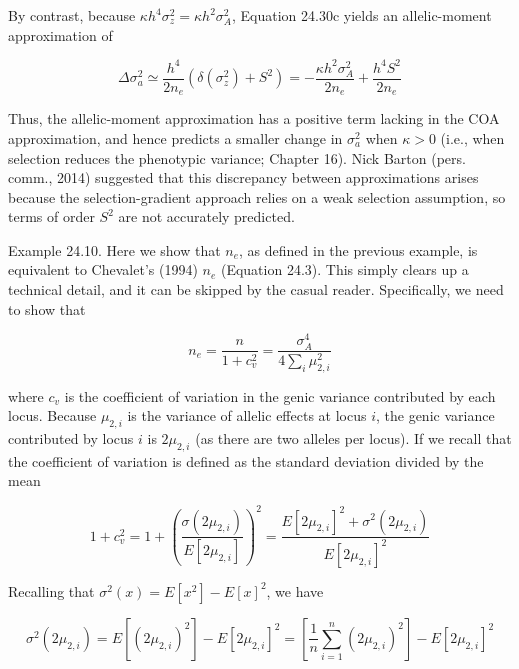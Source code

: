 \documentclass{article}
\begin{document}
By contrast, because  $ \kappa h^4\sigma_z^2 = \kappa h^2\sigma_A^2 $, Equation 24.30c yields an allelic-moment approximation of

\begin{equation}
\Delta\sigma_{a}^{2}\simeq\frac{h^{4}}{2n_{e}}\left(\delta(\sigma_{z}^{2})+S^{2}\right)=-\frac{\kappa h^{2}\sigma_{A}^{2}}{2n_{e}}+\frac{h^{4}S^{2}}{2n_{e}}
\tag{24.30e}
\label{eq:24_30e}
\end{equation}

Thus, the allelic-moment approximation has a positive term lacking in the COA approximation, and hence predicts a smaller change in  $ \sigma_a^2 $ when  $ \kappa > 0 $ (i.e., when selection reduces the phenotypic variance; Chapter 16). Nick Barton (pers. comm., 2014) suggested that this discrepancy between approximations arises because the selection-gradient approach relies on a weak selection assumption, so terms of order  $ S^2 $ are not accurately predicted.

Example 24.10. Here we show that  $ n_{e} $, as defined in the previous example, is equivalent to Chevalet's (1994)  $ n_{e} $ (Equation 24.3). This simply clears up a technical detail, and it can be skipped by the casual reader. Specifically, we need to show that

\begin{equation}
n_{e}=\frac{n}{1+c_{v}^{2}}=\frac{\sigma_{A}^{4}}{4\sum_{i}\mu_{2,i}^{2}}
\end{equation}

where  $ c_v $ is the coefficient of variation in the genic variance contributed by each locus. Because  $ \mu_{2,i} $ is the variance of allelic effects at locus  $ i $, the genic variance contributed by locus  $ i $ is  $ 2\mu_{2,i} $ (as there are two alleles per locus). If we recall that the coefficient of variation is defined as the standard deviation divided by the mean

\begin{equation}
1+c_{v}^{2}=1+\left(\frac{\sigma(2\mu_{2,i})}{E[2\mu_{2,i}]}\right)^{2}=\frac{E[2\mu_{2,i}]^{2}+\sigma^{2}(2\mu_{2,i})}{E[2\mu_{2,i}]^{2}}
\tag{24.31a}
\label{eq:24_31a}
\end{equation}

Recalling that  $ \sigma^2(x) = E[x^2] - E[x]^2 $, we have

\begin{equation}
\sigma^{2}(2\mu_{2,i})=E\left[(2\mu_{2,i})^{2}\right]-E[2\mu_{2,i}]^{2}=\left[\frac{1}{n}\sum_{i=1}^{n}(2\mu_{2,i})^{2}\right]-E[2\mu_{2,i}]^{2}
\tag{24.31b}
\label{eq:24_31b}
\end{equation}
\end{document}

